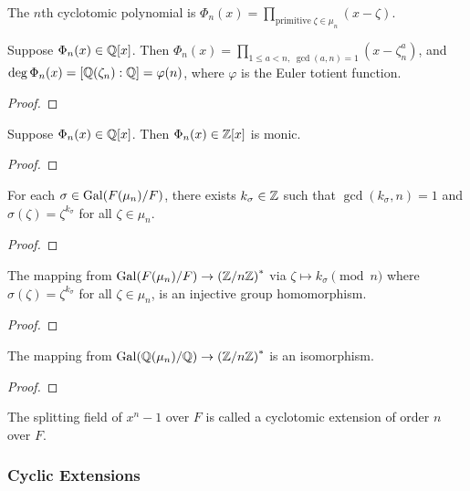 \begin{definition}
    The \(n\)th cyclotomic polynomial is
    \(\Phi_n(x) = \prod_{\text{primitive}\;\zeta\in\mu_n} (x-\zeta)\).
\end{definition}
\begin{proposition}
    Suppose \(\Phi_n(x) \in \mathbb{Q}[x]\).
    Then \(\Phi_n(x)  = \prod_{1 \leq a < n,\; \gcd(a,n) = 1} (x-\zeta_n^a)\),
    and \(\deg \Phi_n(x) = [\mathbb{Q}(\zeta_n):\mathbb{Q}] = \varphi(n)\),
    where \(\varphi\) is the Euler totient function.
\end{proposition}
\begin{proof}
\end{proof}
\begin{proposition}
    Suppose \(\Phi_n(x) \in \mathbb{Q}[x]\).
    Then \(\Phi_n(x) \in \mathbb{Z}[x]\) is monic.
\end{proposition}
\begin{proof}
\end{proof}

\begin{lemma}
    For each \(\sigma \in \operatorname{Gal}(F(\mu_n)/F)\),
    there exists \(k_\sigma \in \mathbb{Z}\) such that \(\gcd(k_\sigma,n) = 1\)
    and \(\sigma(\zeta) = \zeta^{k_\sigma}\) for all \(\zeta \in \mu_n\).
\end{lemma}
\begin{proof}
\end{proof}
\begin{theorem}
    The mapping from \(\operatorname{Gal}(F(\mu_n)/F) \to {(\mathbb{Z}/n\mathbb{Z})}^\ast\)
    via \(\zeta \mapsto k_\sigma \pmod{n}\)
    where \(\sigma(\zeta) = \zeta^{k_\sigma}\) for all \(\zeta \in \mu_n\),
    is an injective group homomorphism.
\end{theorem}
\begin{proof}
\end{proof}
\begin{theorem}
    The mapping from \(\operatorname{Gal}(\mathbb{Q}(\mu_n)/\mathbb{Q}) \to {(\mathbb{Z}/n\mathbb{Z})}^\ast\)
    is an isomorphism.
\end{theorem}
\begin{proof}
\end{proof}

\begin{definition}
    The splitting field of \(x^n - 1\) over \(F\)
    is called a cyclotomic extension of order \(n\) over \(F\).
\end{definition}


\subsubsection*{Cyclic Extensions}

